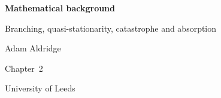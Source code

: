 \documentclass[11pt]{report}
\begin{document}
\begin{titlepage}
\centering
\vspace*{4cm}
{\LARGE\bfseries Mathematical background\par}
\vspace{6pt}
{\large Branching, quasi-stationarity, catastrophe and absorption\par}
\vspace{2.5cm}
{\large Adam Aldridge\par}
\vspace{6pt}
{Chapter~2\par}
\vspace{4pt}
{University of Leeds\par}
\end{titlepage}

\tableofcontents
\clearpage



\FloatBarrier
\begingroup
\footnotesize


\endgroup
\end{document}
